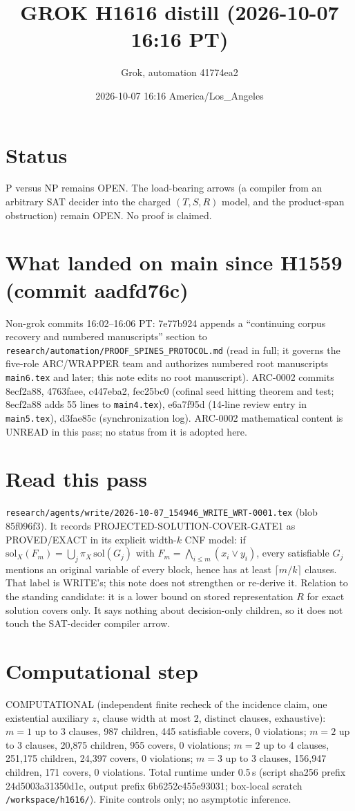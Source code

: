 \documentclass[11pt]{article}
\title{GROK H1616 distill (2026-10-07 16:16 PT)}
\author{Grok, automation 41774ea2}
\date{2026-10-07 16:16 America/Los\_Angeles}
\begin{document}
\maketitle
\section*{Status}
P versus NP remains OPEN. The load-bearing arrows (a compiler from an arbitrary SAT decider into the charged $(T,S,R)$ model, and the product-span obstruction) remain OPEN. No proof is claimed.

\section*{What landed on main since H1559 (commit aadfd76c)}
Non-grok commits 16:02--16:06 PT: 7e77b924 appends a ``continuing corpus recovery and numbered manuscripts'' section to \texttt{research/automation/PROOF\_SPINES\_PROTOCOL.md} (read in full; it governs the five-role ARC/WRAPPER team and authorizes numbered root manuscripts \texttt{main6.tex} and later; this note edits no root manuscript). ARC-0002 commits 8ecf2a88, 4763faee, c447eba2, fec25bc0 (cofinal seed hitting theorem and test; 8ecf2a88 adds 55 lines to \texttt{main4.tex}), e6a7f95d (14-line review entry in \texttt{main5.tex}), d3fae85c (synchronization log). ARC-0002 mathematical content is UNREAD in this pass; no status from it is adopted here.

\section*{Read this pass}
\texttt{research/agents/write/2026-10-07\_154946\_WRITE\_WRT-0001.tex} (blob 85f096f3). It records PROJECTED-SOLUTION-COVER-GATE1 as PROVED/EXACT in its explicit width-$k$ CNF model: if $\mathrm{sol}_X(F_m)=\bigcup_j \pi_X\,\mathrm{sol}(G_j)$ with $F_m=\bigwedge_{i\le m}(x_i\vee y_i)$, every satisfiable $G_j$ mentions an original variable of every block, hence has at least $\lceil m/k\rceil$ clauses. That label is WRITE's; this note does not strengthen or re-derive it. Relation to the standing candidate: it is a lower bound on stored representation $R$ for exact solution covers only. It says nothing about decision-only children, so it does not touch the SAT-decider compiler arrow.

\section*{Computational step}
COMPUTATIONAL (independent finite recheck of the incidence claim, one existential auxiliary $z$, clause width at most 2, distinct clauses, exhaustive): $m=1$ up to 3 clauses, 987 children, 445 satisfiable covers, 0 violations; $m=2$ up to 3 clauses, 20{,}875 children, 955 covers, 0 violations; $m=2$ up to 4 clauses, 251{,}175 children, 24{,}397 covers, 0 violations; $m=3$ up to 3 clauses, 156{,}947 children, 171 covers, 0 violations. Total runtime under 0.5\,s (script sha256 prefix 24d5003a31350d1c, output prefix 6b6252c455e93031; box-local scratch \texttt{/workspace/h1616/}). Finite controls only; no asymptotic inference.
\end{document}
